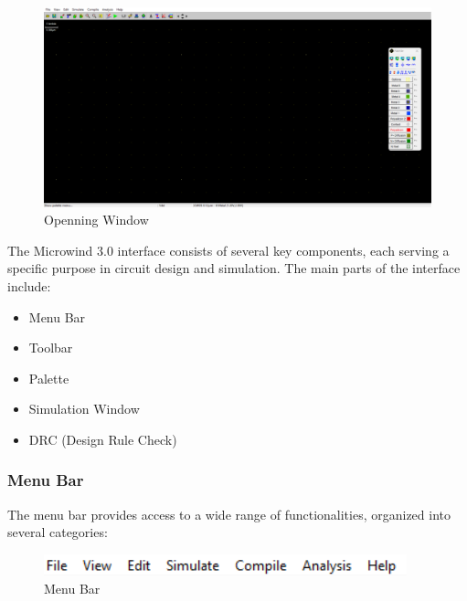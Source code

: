 \documentclass[a4paper,12pt]{article}
\begin{document}
	\begin{figure}[h]
		\centering
		\includegraphics[width=1\linewidth]{Images/microwind/window}
		\caption{Openning Window}
		\label{fig:window}
	\end{figure}
	\newpage
	The Microwind 3.0 interface consists of several key components, each serving a specific purpose in circuit design and simulation. The main parts of the interface include:
	
	\begin{itemize}
		\item Menu Bar
		\item Toolbar
		\item Palette
		\item Simulation Window
		\item DRC (Design Rule Check)
	\end{itemize}
	
	\subsubsection{Menu Bar}
	The menu bar provides access to a wide range of functionalities, organized into several categories:
	
	\begin{figure}[h]
		\centering
		\includegraphics[width=.7\linewidth]{Images/microwind/menubar}
		\caption{Menu Bar}
		\label{fig:menubar}
	\end{figure}
	
\end{document}

